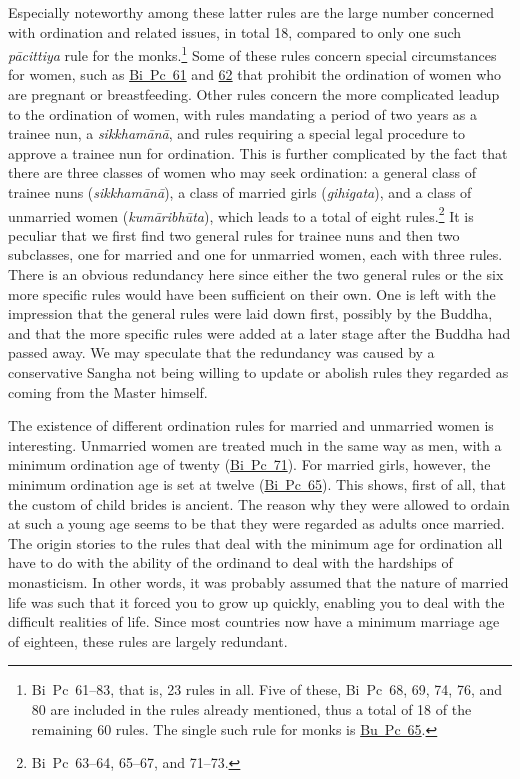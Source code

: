 \documentclass[12pt,openany]{book}%
\begin{document}
Especially noteworthy among these latter rules are the large number concerned with ordination and related issues, in total 18, compared to only one such \textit{\textsanskrit{pācittiya}} rule for the monks.\footnote{Bi Pc 61–83, that is, 23 rules in all. Five of these, Bi Pc 68, 69, 74, 76, and 80 are included in the rules already mentioned, thus a total of 18 of the remaining 60 rules. The single such rule for monks is \href{https://suttacentral.net/pli-tv-bu-vb-pc65/en/brahmali\#1.53.1}{Bu~Pc~65}. } Some of these rules concern special circumstances for women, such as \href{https://suttacentral.net/pli-tv-bi-vb-pc61/en/brahmali\#1.17.1}{Bi~Pc~61} and \href{https://suttacentral.net/pli-tv-bi-vb-pc62/en/brahmali\#1.17.1}{62} that prohibit the ordination of women who are pregnant or breastfeeding. Other rules concern the more complicated leadup to the ordination of women, with rules mandating a period of two years as a trainee nun, a \textit{\textsanskrit{sikkhamānā}}, and rules requiring a special legal procedure to approve a trainee nun for ordination. This is further complicated by the fact that there are three classes of women who may seek ordination: a general class of trainee nuns (\textit{\textsanskrit{sikkhamānā}}), a class of married girls (\textit{gihigata}), and a class of unmarried women (\textit{\textsanskrit{kumāribhūta}}), which leads to a total of eight rules.\footnote{Bi Pc 63–64, 65–67, and 71–73. } It is peculiar that we first find two general rules for trainee nuns and then two subclasses, one for married and one for unmarried women, each with three rules. There is an obvious redundancy here since either the two general rules or the six more specific rules would have been sufficient on their own. One is left with the impression that the general rules were laid down first, possibly by the Buddha, and that the more specific rules were added at a later stage after the Buddha had passed away. We may speculate that the redundancy was caused by a conservative Sangha not being willing to update or abolish rules they regarded as coming from the Master himself.

The existence of different ordination rules for married and unmarried women is interesting. Unmarried women are treated much in the same way as men, with a minimum ordination age of twenty (\href{https://suttacentral.net/pli-tv-bi-vb-pc71/en/brahmali\#1.17.1}{Bi~Pc~71}). For married girls, however, the minimum ordination age is set at twelve (\href{https://suttacentral.net/pli-tv-bi-vb-pc65/en/brahmali\#1.17.1}{Bi~Pc~65}). This shows, first of all, that the custom of child brides is ancient. The reason why they were allowed to ordain at such a young age seems to be that they were regarded as adults once married. The origin stories to the rules that deal with the minimum age for ordination all have to do with the ability of the ordinand to deal with the hardships of monasticism. In other words, it was probably assumed that the nature of married life was such that it forced you to grow up quickly, enabling you to deal with the difficult realities of life. Since most countries now have a minimum marriage age of eighteen, these rules are largely redundant.
\end{document}
